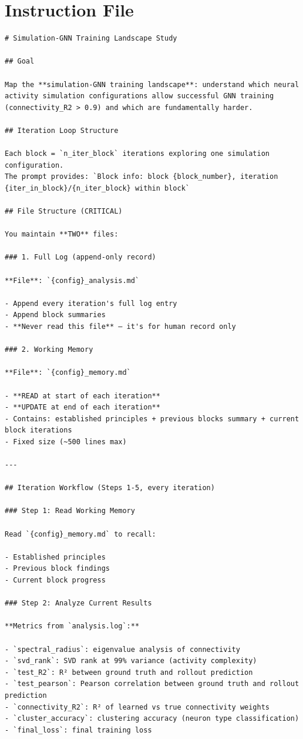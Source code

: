 \documentclass[10pt,twocolumn]{article}
\begin{document}
\section{Instruction File}
\label{app:instruction}

\begin{small}
\begin{verbatim}
# Simulation-GNN Training Landscape Study

## Goal

Map the **simulation-GNN training landscape**: understand which neural activity simulation configurations allow successful GNN training (connectivity_R2 > 0.9) and which are fundamentally harder.

## Iteration Loop Structure

Each block = `n_iter_block` iterations exploring one simulation configuration.
The prompt provides: `Block info: block {block_number}, iteration {iter_in_block}/{n_iter_block} within block`

## File Structure (CRITICAL)

You maintain **TWO** files:

### 1. Full Log (append-only record)

**File**: `{config}_analysis.md`

- Append every iteration's full log entry
- Append block summaries
- **Never read this file** — it's for human record only

### 2. Working Memory

**File**: `{config}_memory.md`

- **READ at start of each iteration**
- **UPDATE at end of each iteration**
- Contains: established principles + previous blocks summary + current block iterations
- Fixed size (~500 lines max)

---

## Iteration Workflow (Steps 1-5, every iteration)

### Step 1: Read Working Memory

Read `{config}_memory.md` to recall:

- Established principles
- Previous block findings
- Current block progress

### Step 2: Analyze Current Results

**Metrics from `analysis.log`:**

- `spectral_radius`: eigenvalue analysis of connectivity
- `svd_rank`: SVD rank at 99% variance (activity complexity)
- `test_R2`: R² between ground truth and rollout prediction
- `test_pearson`: Pearson correlation between ground truth and rollout prediction
- `connectivity_R2`: R² of learned vs true connectivity weights
- `cluster_accuracy`: clustering accuracy (neuron type classification)
- `final_loss`: final training loss


\end{verbatim}
\end{small}
\end{document}
